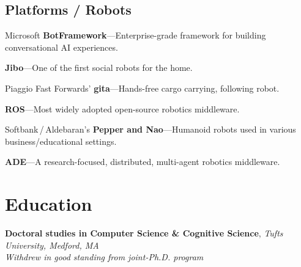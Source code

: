 \documentclass[10pt, letter]{article}
\newcommand{\years}[1]{\marginnote{\footnotesize #1}}
\begin{document}

\subsection*{Platforms / Robots}
\begin{itemize}[leftmargin=*, parsep=1pt]
  {\light
\item Microsoft \textbf{BotFramework}---Enterprise-grade framework for building conversational AI experiences.
\item \textbf{Jibo}---One of the first social robots for the home.
\item Piaggio Fast Forwards' \textbf{gita}---Hands-free cargo carrying, following robot.
\item \textbf{ROS}---Most widely adopted open-source robotics middleware.
\item Softbank\,/\,Aldebaran's \textbf{Pepper and Nao}---Humanoid robots used in various business/educational settings.  
\item \textbf{ADE}---A research-focused, distributed, multi-agent robotics middleware.
  }
\end{itemize}

\section*{Education}
\years{2012 - 2014}
\textbf{Doctoral studies in Computer Science \& Cognitive Science}, \textit{Tufts
  University, Medford, MA}\\
\textit{Withdrew in good standing from joint-Ph.D. program}
\end{document}
